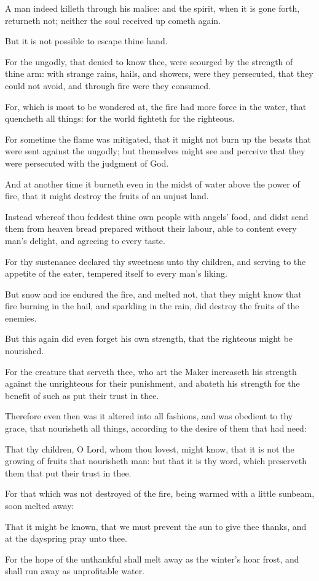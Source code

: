 {\par }{\PP {}A man indeed killeth through his malice: and the spirit, when it is gone forth, returneth not; neither the soul received up cometh again.
\par }{\PP {}But it is not possible to escape thine hand.
\par }{\PP {}For the ungodly, that denied to know thee, were scourged by the strength of thine arm: with strange rains, hails, and showers, were they persecuted, that they could not avoid, and through fire were they consumed.
\par }{\PP {}For, which is most to be wondered at, the fire had more force in the water, that quencheth all things: for the world fighteth for the righteous.
\par }{\PP {}For sometime the flame was mitigated, that it might not burn up the beasts that were sent against the ungodly; but themselves might see and perceive that they were persecuted with the judgment of God.
\par }{\PP {}And at another time it burneth even in the midst of water above the power of fire, that it might destroy the fruits of an unjust land.
\par }{\PP {}Instead whereof thou feddest thine own people with angels’ food, and didst send them from heaven bread prepared without their labour, able to content every man’s delight, and agreeing to every taste.
\par }{\PP {}For thy sustenance declared thy sweetness unto thy children, and serving to the appetite of the eater, tempered itself to every man’s liking.
\par }{\PP {}But snow and ice endured the fire, and melted not, that they might know that fire burning in the hail, and sparkling in the rain, did destroy the fruits of the enemies.
\par }{\PP {}But this again did even forget his own strength, that the righteous might be nourished.
\par }{\PP {}For the creature that serveth thee, who art the Maker increaseth his strength against the unrighteous for their punishment, and abateth his strength for the benefit of such as put their trust in thee.
\par }{\PP {}Therefore even then was it altered into all fashions, and was obedient to thy grace, that nourisheth all things, according to the desire of them that had need:
\par }{\PP {}That thy children, O Lord, whom thou lovest, might know, that it is not the growing of fruits that nourisheth man: but that it is thy word, which preserveth them that put their trust in thee.
\par }{\PP {}For that which was not destroyed of the fire, being warmed with a little sunbeam, soon melted away:
\par }{\PP {}That it might be known, that we must prevent the sun to give thee thanks, and at the dayspring pray unto thee.
\par }{\PP {}For the hope of the unthankful shall melt away as the winter’s hoar frost, and shall run away as unprofitable water.

}
